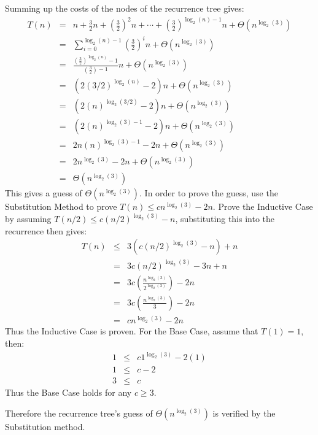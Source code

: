\documentclass{article}
\begin{document}
Summing up the costs of the nodes of the recurrence tree gives:
\begin{eqnarray*}
	T(n) &=& n + \frac{3}{2}n + \left(\frac{3}{2}\right)^2n + \cdots + \left(\frac{3}{2}\right)^{\log_2(n) - 1}n + \Theta(n^{\log_2(3)}) \\
	&=& \sum_{i=0}^{\log_2(n)-1} \left(\frac{3}{2}\right)^in + \Theta(n^{\log_2(3)}) \\
	&=& \frac{\left(\frac{3}{2}\right)^{\log_2(n)} - 1}{\left(\frac{3}{2}\right) - 1}n + \Theta(n^{\log_2(3)}) \\
	&=& (2(3/2)^{\log_2(n)} - 2)n + \Theta(n^{\log_2(3)}) \\
	&=& (2(n)^{\log_2(3/2)} - 2)n + \Theta(n^{\log_2(3)}) \\
	&=& (2(n)^{\log_2(3) - 1} - 2)n + \Theta(n^{\log_2(3)}) \\
	&=& 2n(n)^{\log_2(3) - 1} - 2n + \Theta(n^{\log_2(3)}) \\
	&=& 2n^{\log_2(3)} - 2n + \Theta(n^{\log_2(3)}) \\
	&=& \Theta(n^{\log_2(3)})
\end{eqnarray*}
This gives a guess of $\Theta(n^{\log_2(3)})$.  In order to prove the guess, use the Substitution Method to prove $T(n) \leq cn^{\log_2(3)} - 2n$.  Prove the Inductive Case by assuming $T(n/2) \leq c(n/2)^{\log_2(3)} - n$, substituting this into the recurrence then gives:
\begin{eqnarray*}
	T(n) &\leq& 3(c(n/2)^{\log_2(3)} - n) + n \\
	&=& 3c(n/2)^{\log_2(3)} - 3n + n \\
	&=& 3c\left(\frac{n^{\log_2(3)}}{2^{\log_2(3)}}\right) - 2n \\
	&=& 3c\left(\frac{n^{\log_2(3)}}{3}\right) - 2n \\
	&=& cn^{\log_2(3)} - 2n
\end{eqnarray*}
Thus the Inductive Case is proven.  For the Base Case, assume that $T(1) = 1$, then:
\begin{eqnarray*}
	1 &\leq& c1^{\log_2(3)} - 2(1) \\
	1 &\leq& c - 2 \\
	3 &\leq& c
\end{eqnarray*}
Thus the Base Case holds for any $c \geq 3$.

Therefore the recurrence tree's guess of $\Theta(n^{\log_2(3)})$ is verified by the Substitution method.
\end{document}
